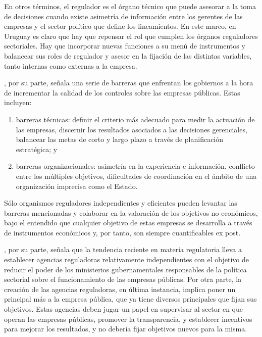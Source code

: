 \documentclass[
  12pt,
  spanish,
]{book}
\providecommand{\tightlist}{%
  \setlength{\itemsep}{0pt}\setlength{\parskip}{0pt}}
\begin{document}
En otros términos, el regulador es el órgano técnico que puede asesorar
a la toma de decisiones cuando existe asimetría de información entre los
gerentes de las empresas y el sector político que define los
lineamientos. En este marco, en Uruguay es claro que hay que repensar el
rol que cumplen los órganos reguladores sectoriales. Hay que incorporar
nuevas funciones a su menú de instrumentos y balancear sus roles de
regulador y asesor en la fijación de las distintas variables, tanto
internas como externas a la empresa.

\citet{Ramamurti1991}, por su parte, señala una serie de barreras que
enfrentan los gobiernos a la hora de incrementar la calidad de los
controles sobre las empresas públicas. Estas incluyen:

\begin{enumerate}
\def\labelenumi{\arabic{enumi}.}
\tightlist
\item
  barreras técnicas: definir el criterio más adecuado para medir la
  actuación de las empresas, discernir los resultados asociados a las
  decisiones gerenciales, balancear las metas de corto y largo plazo a
  través de planificación estratégica; y
\item
  barreras organizacionales: asimetría en la experiencia e información,
  conflicto entre los múltiples objetivos, dificultades de coordinación
  en el ámbito de una organización imprecisa como el Estado.
\end{enumerate}

Sólo organismos reguladores independientes y eficientes pueden levantar
las barreras mencionadas y colaborar en la valoración de los objetivos
no económicos, bajo el entendido que cualquier objetivo de estas
empresas se desarrolla a través de instrumentos económicos y, por tanto,
son siempre cuantificables ex post.

\citet{Berg2013}, por su parte, señala que la tendencia reciente en
materia regulatoria lleva a establecer agencias reguladoras
relativamente independientes con el objetivo de reducir el poder de los
ministerios gubernamentales responsables de la política sectorial sobre
el funcionamiento de las empresas públicas. Por otra parte, la creación
de las agencias reguladoras, en última instancia, implica poner un
principal más a la empresa pública, que ya tiene diversos principales
que fijan sus objetivos. Estas agencias deben jugar un papel en
supervisar al sector en que operan las empresas públicas, promover la
transparencia, y establecer incentivos para mejorar los resultados, y no
debería fijar objetivos nuevos para la misma.
\end{document}
